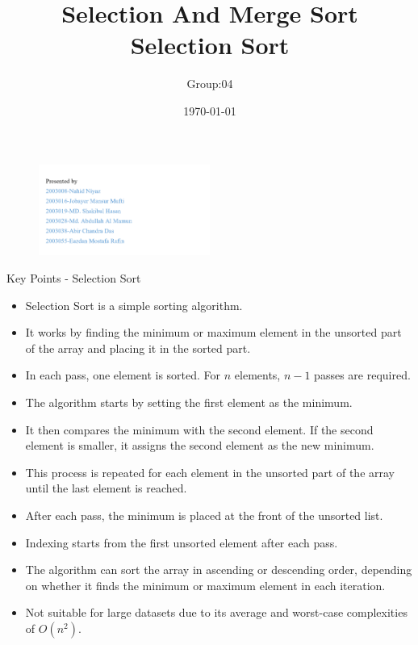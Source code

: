 \documentclass{beamer}
\title{Selection And Merge Sort }
\author{Group:04}
\date{\today}
\begin{document}
\begin{frame}[plain]
  \titlepage
  \begin{figure}
    \includegraphics[width=0.5\textwidth]{graphics/Names1.png} %
  \end{figure}
\end{frame}



\title{Selection Sort}
\author{}
\date{}




\begin{frame}
  \titlepage
\end{frame}


\begin{frame}{Key Points - Selection Sort}
  \begin{itemize}
    \item Selection Sort is a simple sorting algorithm.
    \item It works by finding the minimum or maximum element in the unsorted part of the array and placing it in the sorted part.
    \item In each pass, one element is sorted. For $n$ elements, $n-1$ passes are required.
    \item The algorithm starts by setting the first element as the minimum.
    \item It then compares the minimum with the second element. If the second element is smaller, it assigns the second element as the new minimum.
    \item This process is repeated for each element in the unsorted part of the array until the last element is reached.
    \item After each pass, the minimum is placed at the front of the unsorted list.
    \item Indexing starts from the first unsorted element after each pass.
    \item The algorithm can sort the array in ascending or descending order, depending on whether it finds the minimum or maximum element in each iteration.
    \item Not suitable for large datasets due to its average and worst-case complexities of $O(n^2)$.
  \end{itemize}
\end{frame}
\end{document}
